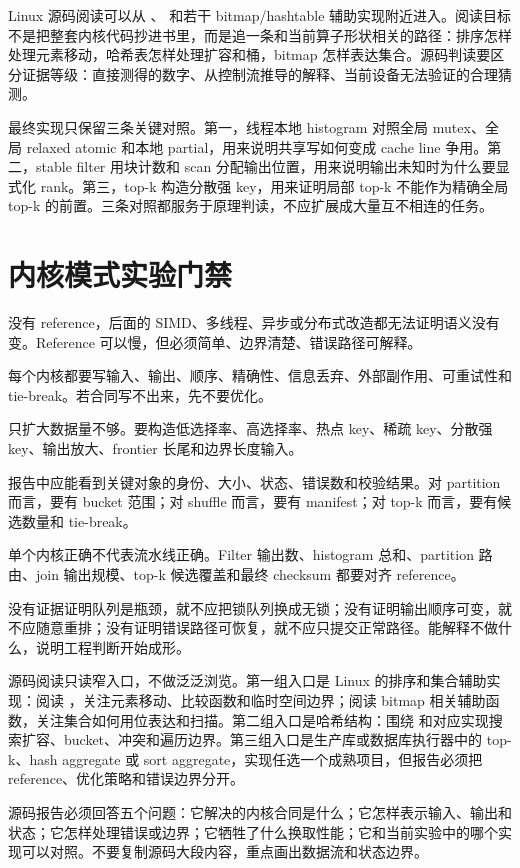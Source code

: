 Linux 源码阅读可以从 、 和若干 bitmap/hashtable 辅助实现附近进入。阅读目标不是把整套内核代码抄进书里，而是追一条和当前算子形状相关的路径：排序怎样处理元素移动，哈希表怎样处理扩容和桶，bitmap 怎样表达集合。源码判读要区分证据等级：直接测得的数字、从控制流推导的解释、当前设备无法验证的合理猜测。

最终实现只保留三条关键对照。第一，线程本地 histogram 对照全局 mutex、全局 relaxed atomic 和本地 partial，用来说明共享写如何变成 cache line 争用。第二，stable filter 用块计数和 scan 分配输出位置，用来说明输出未知时为什么要显式化 rank。第三，top-k 构造分散强 key，用来证明局部 top-k 不能作为精确全局 top-k 的前置。三条对照都服务于原理判读，不应扩展成大量互不相连的任务。

\section{内核模式实验门禁}

没有 reference，后面的 SIMD、多线程、异步或分布式改造都无法证明语义没有变。Reference 可以慢，但必须简单、边界清楚、错误路径可解释。

每个内核都要写输入、输出、顺序、精确性、信息丢弃、外部副作用、可重试性和 tie-break。若合同写不出来，先不要优化。

只扩大数据量不够。要构造低选择率、高选择率、热点 key、稀疏 key、分散强 key、输出放大、frontier 长尾和边界长度输入。

报告中应能看到关键对象的身份、大小、状态、错误数和校验结果。对 partition 而言，要有 bucket 范围；对 shuffle 而言，要有 manifest；对 top-k 而言，要有候选数量和 tie-break。

单个内核正确不代表流水线正确。Filter 输出数、histogram 总和、partition 路由、join 输出规模、top-k 候选覆盖和最终 checksum 都要对齐 reference。

没有证据证明队列是瓶颈，就不应把锁队列换成无锁；没有证明输出顺序可变，就不应随意重排；没有证明错误路径可恢复，就不应只提交正常路径。能解释不做什么，说明工程判断开始成形。

\begin{sourcereadingbox}
源码阅读只读窄入口，不做泛泛浏览。第一组入口是 Linux 的排序和集合辅助实现：阅读 ，关注元素移动、比较函数和临时空间边界；阅读 bitmap 相关辅助函数，关注集合如何用位表达和扫描。第二组入口是哈希结构：围绕  和对应实现搜索扩容、bucket、冲突和遍历边界。第三组入口是生产库或数据库执行器中的 top-k、hash aggregate 或 sort aggregate，实现任选一个成熟项目，但报告必须把 reference、优化策略和错误边界分开。

源码报告必须回答五个问题：它解决的内核合同是什么；它怎样表示输入、输出和状态；它怎样处理错误或边界；它牺牲了什么换取性能；它和当前实验中的哪个实现可以对照。不要复制源码大段内容，重点画出数据流和状态边界。
\end{sourcereadingbox}

